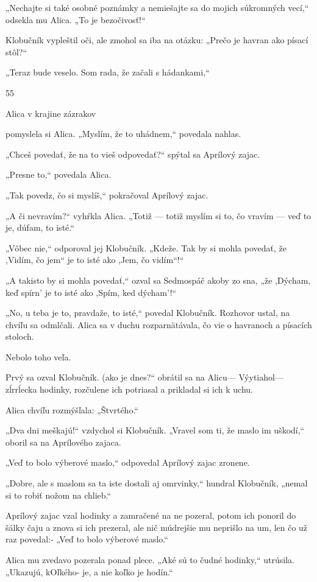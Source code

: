 \documentclass[12pt]{book}
\begin{document}
\begin{Parallel}[p]{}{}
{„Nechajte si také osobné poznámky a nemiešajte sa do
mojich súkromných vecí,“ odsekla mu Alica. „To je
bezočivosť!“

Klobučník vypleštil oči, ale zmohol sa iba na otázku:
„Prečo je havran ako písací stôl?“

„Teraz bude veselo. Som rada, že začali s hádankami,“

55

Alica v krajine zázrakov

pomyslela si Alica. „Myslím, že to uhádnem,“ povedala
nahlas.

„Chceš povedať, že na to vieš odpovedať?“ spýtal sa
Aprílový zajac.

„Presne to,“ povedala Alica.

„Tak povedz, čo si myslíš,“ pokračoval Aprílový zajac.

„A či nevravím?“ vyhŕkla Alica. „Totiž — totiž myslím si
to, čo vravím — veď to je, dúfam, to isté.“

„Vôbec nie,“ odporoval jej Klobučník. „Kdeže. Tak by si
mohla povedať, že ,Vidím, čo jem“ je to isté ako ,Jem, čo
vidím“!“

„A takisto by si mohla povedať,“ ozval sa Sedmospáč
akoby zo sna, „že ,Dýcham, keď spírn' je to isté ako ,Spím,
ked dýcham'!“

„No, u teba je to, pravdaže, to isté,“ povedal Klobučník.
Rozhovor ustal, na chvíľu sa odmlčali. Alica sa v duchu
rozparnätávala, čo vie o havranoch a písacích stoloch.

Nebolo toho veľa.

Prvý sa ozval Klobučník. (ako je dnes?“ obrátil sa na
Alicu— Výytiahol—zĺrrĺecka hodinky, rozčulene ich potriasal
a prikladal si ich k uchu.

Alica chvíľu rozmýšľala: „Štvrtého.“

„Dva dni meškajú!“ vzdychol si Klobučník. „Vravel
som ti, že maslo im uškodí,“ oboril sa na Aprílového
zajaca.

„Veď to bolo výberové maslo,“ odpovedal Aprílový zajac
zronene.

„Dobre, ale s maslom sa ta iste dostali aj omrvinky,“
hundral Klobučník, „nemal si to robiť nožom na chlieb.“

Aprílový zajac vzal hodinky a zamračené na ne pozeral,
potom ich ponoril do šálky čaju a znova si ich prezeral, ale
nič múdrejšie mu neprišlo na um, len čo už raz povedal:-
„Veď to bolo výberové maslo.“

Alica mu zvedavo pozerala ponad plece. „Aké sú to čudné
hodinky,“ utrúsila. „Ukazujú, kOľkého- je, a nie koľko je
hodín.“

}
\end{Parallel}
\end{document}

